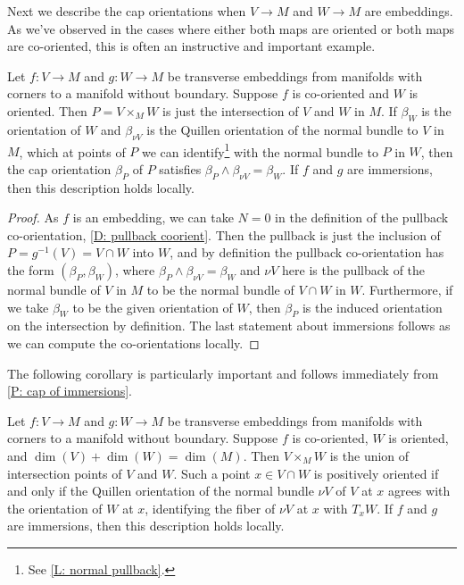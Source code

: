 Next we describe the cap orientations when $V \to M$ and $W \to M$ are embeddings.
As we've observed in the cases where either both maps are oriented or both maps are co-oriented, this is often an instructive and important example.

\begin{proposition}\label{P: cap of immersions}
	Let $f \colon V \to M$ and $g \colon W \to M$ be transverse embeddings from manifolds with corners to a manifold without boundary.
	Suppose $f$ is co-oriented and $W$ is oriented.
	Then $P = V \times_M W$ is just the intersection of $V$ and $W$ in $M$.
	If $\beta_W$ is the orientation of $W$ and $\beta_{\nu V}$ is the Quillen orientation of the normal bundle to $V$ in $M$, which at points of $P$ we can identify\footnote{See \cref{L: normal pullback}.} with the normal bundle to $P$ in $W$, then the cap orientation $\beta_P$ of $P$ satisfies $\beta_P \wedge \beta_{\nu V} = \beta_W$.
	If $f$ and $g$ are immersions, then this description holds locally.
\end{proposition}

\begin{proof}
	As $f$ is an embedding, we can take $N = 0$ in the definition of the pullback co-orientation, \cref{D: pullback coorient}.
	Then the pullback is just the inclusion of $P = g^{-1}(V) = V \cap W$ into $W$, and by definition the pullback co-orientation has the form $(\beta_P,\beta_W)$, where $\beta_P \wedge \beta_{\nu V} = \beta_W$ and $\nu V$ here is the pullback of the normal bundle of $V$ in $M$ to be the normal bundle of $V \cap W$ in $W$.
	Furthermore, if we take $\beta_W$ to be the given orientation of $W$, then $\beta_P$ is the induced orientation on the intersection by definition.
	The last statement about immersions follows as we can compute the co-orientations locally.
\end{proof}

The following corollary is particularly important and follows immediately from \cref{P: cap of immersions}.

\begin{corollary}\label{C: complementary cap}
	Let $f \colon V \to M$ and $g \colon W \to M$ be transverse embeddings from manifolds with corners to a manifold without boundary.
	Suppose $f$ is co-oriented, $W$ is oriented, and $\dim(V) + \dim(W) = \dim(M)$.
	Then $V \times_M W$ is the union of intersection points of $V$ and $W$.
	Such a point $x \in V \cap W$ is positively oriented if and only if the Quillen orientation of the normal bundle $\nu V$ of $V$ at $x$ agrees with the orientation of $W$ at $x$, identifying the fiber of $\nu V$ at $x$ with $T_xW$.
	If $f$ and $g$ are immersions, then this description holds locally.
\end{corollary}

